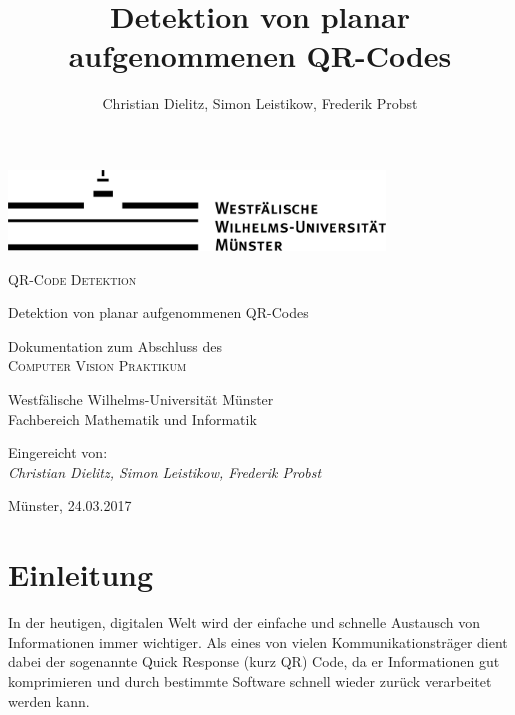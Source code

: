 \documentclass[a4paper, oneside, 12pt]{article}
\title{Detektion von planar aufgenommenen QR-Codes}
\author{Christian Dielitz, Simon Leistikow, Frederik Probst}
\begin{document}
\thispagestyle{empty}  %

\hspace*{1em}
\begin{center}
	\includegraphics[width=10cm]{images/wwu_logo}
	\par
	\vspace*{8ex}
	\Huge
	\Large\textsc{QR-Code Detektion}
	
	\vspace{10pt}
	\large Detektion von planar aufgenommenen QR-Codes
	
	\par
	\normalsize
	\vspace*{8ex}
	\normalsize
	Dokumentation zum Abschluss des\\
	\large
	\textsc{Computer Vision Praktikum}
	\par
	\normalsize
	\vspace*{12ex}
	Westfälische Wilhelms-Universität Münster\\
	Fachbereich Mathematik und Informatik\\
\end{center}
\par

\vspace*{34ex}
Eingereicht von:\\
\large
\textit{Christian Dielitz, Simon Leistikow, Frederik Probst}
\par
\normalsize
\vspace*{4ex}
Münster, 24.03.2017
\vfill
\hspace*{1em}



\newpage
\tableofcontents

\newpage

\section{Einleitung}
\label{s:einleitung}
In der heutigen, digitalen Welt wird der einfache und schnelle Austausch von Informationen immer wichtiger. Als eines von vielen Kommunikationsträger dient dabei der sogenannte Quick Response (kurz QR) Code, da er Informationen gut komprimieren und durch bestimmte Software schnell wieder zurück verarbeitet werden kann.
\end{document}
